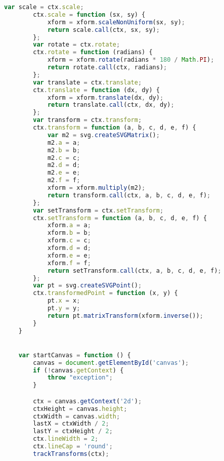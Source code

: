 \begin{lstlisting}[language=JavaScript, label={lst:renderFactory}, caption=When render frames are requested this file compiles the lines of gcode from the worker and sets up the rest of the canvas frames.]
        var scale = ctx.scale;
        ctx.scale = function (sx, sy) {
            xform = xform.scaleNonUniform(sx, sy);
            return scale.call(ctx, sx, sy);
        };
        var rotate = ctx.rotate;
        ctx.rotate = function (radians) {
            xform = xform.rotate(radians * 180 / Math.PI);
            return rotate.call(ctx, radians);
        };
        var translate = ctx.translate;
        ctx.translate = function (dx, dy) {
            xform = xform.translate(dx, dy);
            return translate.call(ctx, dx, dy);
        };
        var transform = ctx.transform;
        ctx.transform = function (a, b, c, d, e, f) {
            var m2 = svg.createSVGMatrix();
            m2.a = a;
            m2.b = b;
            m2.c = c;
            m2.d = d;
            m2.e = e;
            m2.f = f;
            xform = xform.multiply(m2);
            return transform.call(ctx, a, b, c, d, e, f);
        };
        var setTransform = ctx.setTransform;
        ctx.setTransform = function (a, b, c, d, e, f) {
            xform.a = a;
            xform.b = b;
            xform.c = c;
            xform.d = d;
            xform.e = e;
            xform.f = f;
            return setTransform.call(ctx, a, b, c, d, e, f);
        };
        var pt = svg.createSVGPoint();
        ctx.transformedPoint = function (x, y) {
            pt.x = x;
            pt.y = y;
            return pt.matrixTransform(xform.inverse());
        }
    }


    var startCanvas = function () {
        canvas = document.getElementById('canvas');
        if (!canvas.getContext) {
            throw "exception";
        }

        ctx = canvas.getContext('2d');
        ctxHeight = canvas.height;
        ctxWidth = canvas.width;
        lastX = ctxWidth / 2;
        lastY = ctxHeight / 2;
        ctx.lineWidth = 2;
        ctx.lineCap = 'round';
        trackTransforms(ctx);


\end{lstlisting}
